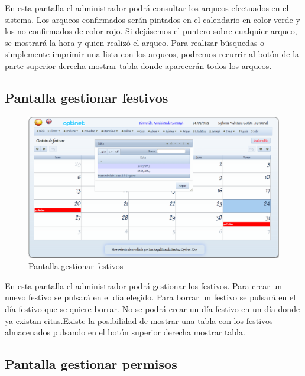 \documentclass[a4paper,11pt]{book}
\begin{document}
En esta pantalla el administrador podrá consultar los arqueos efectuados en el sistema. Los arqueos confirmados serán pintados en el calendario en color verde y los no confirmados de color rojo. Si dejásemos el puntero sobre cualquier arqueo, se mostrará la hora y quien realizó el arqueo. Para realizar búsquedas o simplemente imprimir una lista con los arqueos, podremos recurrir al botón de la parte superior derecha mostrar tabla donde aparecerán todos los arqueos.


\newpage
\subsection {Pantalla gestionar festivos}

\begin{figure}[!htb]
  \centering
    \includegraphics[scale=0.35]{capfestivos.png}
  \caption{Pantalla gestionar festivos}
  \label{a}
\end{figure}

En esta pantalla el administrador podrá gestionar los festivos. Para crear un nuevo festivo se pulsará en el día elegido. Para borrar un festivo se pulsará en el día festivo que se quiere borrar. No se podrá crear un día festivo en un día donde ya existan citas.Existe la posibilidad de mostrar una tabla con los festivos almacenados pulsando en el botón superior derecha mostrar tabla.

\newpage
\subsection {Pantalla gestionar permisos}
\end{document}
